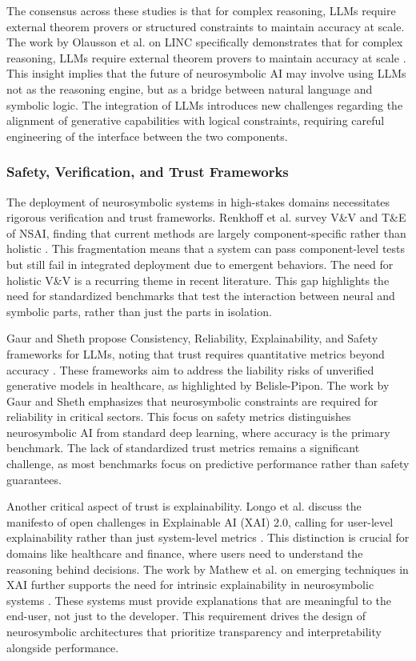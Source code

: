\documentclass{article}
\begin{document}
The consensus across these studies is that for complex reasoning, LLMs require external theorem provers or structured constraints to maintain accuracy at scale. The work by Olausson et al. on LINC specifically demonstrates that for complex reasoning, LLMs require external theorem provers to maintain accuracy at scale \cite{olausson2023linc}. This insight implies that the future of neurosymbolic AI may involve using LLMs not as the reasoning engine, but as a bridge between natural language and symbolic logic. The integration of LLMs introduces new challenges regarding the alignment of generative capabilities with logical constraints, requiring careful engineering of the interface between the two components.

\subsubsection{Safety, Verification, and Trust Frameworks}

\label{sec:safety_verification_and_trust_frameworks}

The deployment of neurosymbolic systems in high-stakes domains necessitates rigorous verification and trust frameworks. Renkhoff et al. survey V\&V and T\&E of NSAI, finding that current methods are largely component-specific rather than holistic \cite{renkhoff2024survey}. This fragmentation means that a system can pass component-level tests but still fail in integrated deployment due to emergent behaviors. The need for holistic V\&V is a recurring theme in recent literature. This gap highlights the need for standardized benchmarks that test the interaction between neural and symbolic parts, rather than just the parts in isolation.

Gaur and Sheth propose Consistency, Reliability, Explainability, and Safety frameworks for LLMs, noting that trust requires quantitative metrics beyond accuracy \cite{gaur2023building}. These frameworks aim to address the liability risks of unverified generative models in healthcare, as highlighted by Belisle-Pipon. The work by Gaur and Sheth emphasizes that neurosymbolic constraints are required for reliability in critical sectors. This focus on safety metrics distinguishes neurosymbolic AI from standard deep learning, where accuracy is the primary benchmark. The lack of standardized trust metrics remains a significant challenge, as most benchmarks focus on predictive performance rather than safety guarantees.

Another critical aspect of trust is explainability. Longo et al. discuss the manifesto of open challenges in Explainable AI (XAI) 2.0, calling for user-level explainability rather than just system-level metrics \cite{longo2024explainable}. This distinction is crucial for domains like healthcare and finance, where users need to understand the reasoning behind decisions. The work by Mathew et al. on emerging techniques in XAI further supports the need for intrinsic explainability in neurosymbolic systems \cite{mathew2025recent}. These systems must provide explanations that are meaningful to the end-user, not just to the developer. This requirement drives the design of neurosymbolic architectures that prioritize transparency and interpretability alongside performance.
\end{document}
